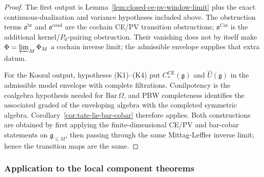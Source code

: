 \begin{proof}
  The first output is Lemma~\ref{lem:closed-ce-pv-window-limit} plus the
  exact continuous-dualization and variance hypotheses included above.
  The obstruction terms \(\mathfrak o^{\mathrm{br}}\) and
  \(\mathfrak o^{\mathrm{coad}}\) are the cochain CE/PV transition
  obstructions; \(\mathfrak o^{\mathrm{Cas}}\) is the additional
  kernel/\(P_0\)-pairing obstruction.  Their vanishing does not by itself
  make \(\Phi=\varprojlim_M\Phi_M\) a cochain inverse limit; the
  admissible envelope supplies that extra datum.

  For the Koszul output, hypotheses (K1)--(K4) put
  \(C_*^{\mathrm{CE}}(\mathfrak g)\) and
  \(\widehat U(\mathfrak g)\) in the admissible model envelope with
  complete filtrations.  Conilpotency is the coalgebra hypothesis
  needed for \(\mathrm{Bar}\,\Omega\), and PBW completeness identifies
  the associated graded of the enveloping algebra with the completed
  symmetric algebra.  Corollary~\ref{cor:tate-lie-bar-cobar} therefore
  applies.  Both constructions are obtained by first applying the
  finite-dimensional CE/PV and bar-cobar statements on
  \(\mathfrak g_{\leq M}\), then passing through the same
  Mittag-Leffler inverse limit; hence the transition maps are the same.
\end{proof}

\subsubsection{Application to the local component theorems}

